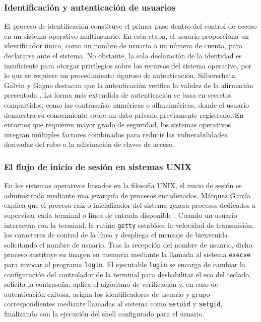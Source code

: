 \subsubsection{Identificación y autenticación de usuarios}

El proceso de identificación constituye el primer paso dentro del control de acceso en un sistema operativo multiusuario.
En esta etapa, el usuario proporciona un identificador único, como un nombre de usuario o un número de cuenta, para declararse ante el sistema.
No obstante, la sola declaración de la identidad es insuficiente para otorgar privilegios sobre los recursos del sistema operativo, por lo que se requiere un procedimiento riguroso de autenticación.
Silberschatz, Galvin y Gagne destacan que la autenticación verifica la validez de la afirmación presentada \cite{silberschatz2006}.
La forma más extendida de autenticación se basa en secretos compartidos, como las contraseñas numéricas o alfanuméricas, donde el usuario demuestra su conocimiento sobre un dato privado previamente registrado.
En entornos que requieren mayor grado de seguridad, los sistemas operativos integran múltiples factores combinados para reducir las vulnerabilidades derivadas del robo o la adivinación de claves de acceso.

\subsubsection{El flujo de inicio de sesión en sistemas UNIX}

En los sistemas operativos basados en la filosofía UNIX, el inicio de sesión es administrado mediante una jerarquía de procesos encadenados.
Márquez García explica que el proceso raíz o inicializador del sistema genera procesos dedicados a supervisar cada terminal o línea de entrada disponible \cite{marquez2004}.
Cuando un usuario interactúa con la terminal, la rutina \texttt{getty} establece la velocidad de transmisión, los caracteres de control de la línea y despliega el mensaje de bienvenida solicitando el nombre de usuario.
Tras la recepción del nombre de usuario, dicho proceso sustituye su imagen en memoria mediante la llamada al sistema \texttt{execve} para invocar al programa \texttt{login}.
El ejecutable \texttt{login} se encarga de cambiar la configuración del controlador de la terminal para deshabilitar el eco del teclado, solicita la contraseña, aplica el algoritmo de verificación y, en caso de autenticación exitosa, asigna los identificadores de usuario y grupo correspondientes mediante llamadas al sistema como \texttt{setuid} y \texttt{setgid}, finalizando con la ejecución del shell configurado para el usuario.

